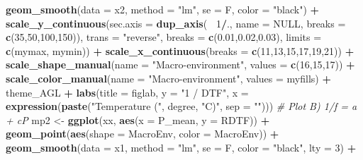 \documentclass[
]{article}
\newenvironment{Shaded}{\begin{snugshade}}{\end{snugshade}}
\newcommand{\CommentTok}[1]{\textcolor[rgb]{0.56,0.35,0.01}{\textit{#1}}}
\newcommand{\DataTypeTok}[1]{\textcolor[rgb]{0.13,0.29,0.53}{#1}}
\newcommand{\DecValTok}[1]{\textcolor[rgb]{0.00,0.00,0.81}{#1}}
\newcommand{\FloatTok}[1]{\textcolor[rgb]{0.00,0.00,0.81}{#1}}
\newcommand{\KeywordTok}[1]{\textcolor[rgb]{0.13,0.29,0.53}{\textbf{#1}}}
\newcommand{\NormalTok}[1]{#1}
\newcommand{\OperatorTok}[1]{\textcolor[rgb]{0.81,0.36,0.00}{\textbf{#1}}}
\newcommand{\OtherTok}[1]{\textcolor[rgb]{0.56,0.35,0.01}{#1}}
\newcommand{\StringTok}[1]{\textcolor[rgb]{0.31,0.60,0.02}{#1}}
\begin{document}
\begin{Shaded}
\begin{Highlighting}[]
{{{{{\StringTok{    }\KeywordTok{geom_smooth}\NormalTok{(}\DataTypeTok{data =}\NormalTok{ x2, }\DataTypeTok{method =} \StringTok{"lm"}\NormalTok{, }\DataTypeTok{se =}\NormalTok{ F, }\DataTypeTok{color =} \StringTok{"black"}\NormalTok{) }\OperatorTok{+}
\StringTok{    }\KeywordTok{scale_y_continuous}\NormalTok{(}\DataTypeTok{sec.axis =} \KeywordTok{dup_axis}\NormalTok{(}\OperatorTok{~}\StringTok{ }\DecValTok{1}\OperatorTok{/}\NormalTok{., }\DataTypeTok{name =} \OtherTok{NULL}\NormalTok{, }\DataTypeTok{breaks =} \KeywordTok{c}\NormalTok{(}\DecValTok{35}\NormalTok{,}\DecValTok{50}\NormalTok{,}\DecValTok{100}\NormalTok{,}\DecValTok{150}\NormalTok{)),}
                       \DataTypeTok{trans =} \StringTok{"reverse"}\NormalTok{, }\DataTypeTok{breaks =} \KeywordTok{c}\NormalTok{(}\FloatTok{0.01}\NormalTok{,}\FloatTok{0.02}\NormalTok{,}\FloatTok{0.03}\NormalTok{), }
                       \DataTypeTok{limits =} \KeywordTok{c}\NormalTok{(mymax, mymin)) }\OperatorTok{+}
\StringTok{    }\KeywordTok{scale_x_continuous}\NormalTok{(}\DataTypeTok{breaks =} \KeywordTok{c}\NormalTok{(}\DecValTok{11}\NormalTok{,}\DecValTok{13}\NormalTok{,}\DecValTok{15}\NormalTok{,}\DecValTok{17}\NormalTok{,}\DecValTok{19}\NormalTok{,}\DecValTok{21}\NormalTok{)) }\OperatorTok{+}
\StringTok{    }\KeywordTok{scale_shape_manual}\NormalTok{(}\DataTypeTok{name =} \StringTok{"Macro-environment"}\NormalTok{, }\DataTypeTok{values =} \KeywordTok{c}\NormalTok{(}\DecValTok{16}\NormalTok{,}\DecValTok{15}\NormalTok{,}\DecValTok{17}\NormalTok{)) }\OperatorTok{+}
\StringTok{    }\KeywordTok{scale_color_manual}\NormalTok{(}\DataTypeTok{name =} \StringTok{"Macro-environment"}\NormalTok{, }\DataTypeTok{values =}\NormalTok{ myfills) }\OperatorTok{+}
\StringTok{    }\NormalTok{theme_AGL }\OperatorTok{+}\StringTok{ }
\StringTok{    }\KeywordTok{labs}\NormalTok{(}\DataTypeTok{title =}\NormalTok{ figlab, }\DataTypeTok{y =} \StringTok{"1 / DTF"}\NormalTok{, }
         \DataTypeTok{x =} \KeywordTok{expression}\NormalTok{(}\KeywordTok{paste}\NormalTok{(}\StringTok{"Temperature ("}\NormalTok{, degree, }\StringTok{"C)"}\NormalTok{, }\DataTypeTok{sep =} \StringTok{""}\NormalTok{)))}
  \CommentTok{# Plot B) 1/f = a + cP}
\NormalTok{  mp2 <-}\StringTok{ }\KeywordTok{ggplot}\NormalTok{(xx, }\KeywordTok{aes}\NormalTok{(}\DataTypeTok{x =}\NormalTok{ P_mean, }\DataTypeTok{y =}\NormalTok{ RDTF)) }\OperatorTok{+}
\StringTok{    }\KeywordTok{geom_point}\NormalTok{(}\KeywordTok{aes}\NormalTok{(}\DataTypeTok{shape =}\NormalTok{ MacroEnv, }\DataTypeTok{color =}\NormalTok{ MacroEnv)) }\OperatorTok{+}
\StringTok{    }\KeywordTok{geom_smooth}\NormalTok{(}\DataTypeTok{data =}\NormalTok{ x1, }\DataTypeTok{method =} \StringTok{"lm"}\NormalTok{, }\DataTypeTok{se =}\NormalTok{ F, }\DataTypeTok{color =} \StringTok{"black"}\NormalTok{, }\DataTypeTok{lty =} \DecValTok{3}\NormalTok{) }\OperatorTok{+}
}}}}}
\end{Highlighting}
\end{Shaded}
\end{document}
